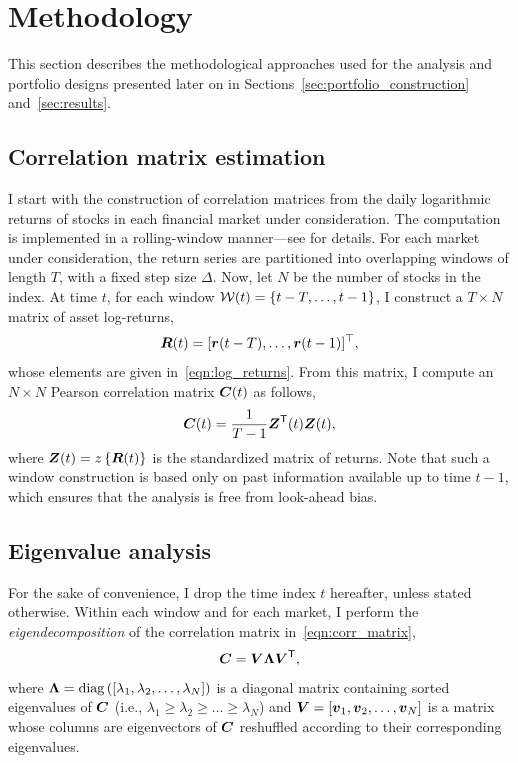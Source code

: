 \documentclass[pdflatex,sn-basic]{sn-jnl}%
\theoremstyle{thmstyleone}%
\theoremstyle{thmstyletwo}%
\theoremstyle{thmstylethree}%
\begin{document}
\section{Methodology}
\label{sec:method}

This section describes the methodological approaches used for the analysis and portfolio designs presented later on 
in Sections~\ref{sec:portfolio_construction} and~\ref{sec:results}. 

\subsection{Correlation matrix estimation}
\label{sec:rolling_window}
I start with the construction of correlation matrices from 
the daily logarithmic returns of stocks in each financial market under consideration. The computation is 
implemented in a rolling-window manner---see \citep{song2011evolution,adams2017correlations} for details.
For each market under consideration, the return series are partitioned into overlapping windows of length $T$, 
with a fixed step size $\Delta$. Now, let $N$ be the number of stocks in the index. At time $t$, 
for each window $\mathcal{W}(t)=\left\{ t-T, \ldots, t-1 \right\}$, I construct a $T\times N$ matrix of asset log-returns,
\begin{equation}
\label{eqn:return_matrix}
    \boldsymbol{R}(t) = [\boldsymbol{r}(t-T), \ldots, \boldsymbol{r}(t-1)]^{\top},
\end{equation}
whose elements are given in~\eqref{eqn:log_returns}. From this matrix, I compute an $N \times N$ Pearson correlation matrix $\boldsymbol{C}(t)$ as follows,
\begin{equation}
\label{eqn:corr_matrix}
    \boldsymbol{C}(t) = \frac{1}{T-1} \boldsymbol{Z}^{\textnormal{\textsf{T}}}(t)\boldsymbol{Z}(t),
\end{equation}
where $\boldsymbol{Z}(t) = z\left\{ \boldsymbol{R}(t) \right\}$ is the standardized matrix of returns. Note that such a window construction is based only on past information available up to time $t-1$, which ensures that the analysis is free from look-ahead bias.

\subsection{Eigenvalue analysis}
For the sake of convenience, I drop the time index $t$ hereafter, unless stated otherwise. Within each window and for each market, I perform the \textit{eigendecomposition} of the correlation matrix in~\eqref{eqn:corr_matrix}, 
\begin{equation}
\label{eqn:eigendecomposition}
    \boldsymbol{C} = \boldsymbol{V} \boldsymbol{\Lambda} \boldsymbol{V}^{\textnormal{\textsf{T}}},
\end{equation}
where $\boldsymbol{\Lambda} = \operatorname{diag}\left( [\lambda_1, \lambda_2, \ldots, \lambda_N] \right)$ is a diagonal matrix containing sorted eigenvalues of $\boldsymbol{C}$ (i.e., $\lambda_1 \geq \lambda_2 \geq \ldots \geq \lambda_N$) and $\boldsymbol{V} = [\boldsymbol{v}_1, \boldsymbol{v}_2, \ldots, \boldsymbol{v}_N]$ is a matrix whose columns are eigenvectors of $\boldsymbol{C}$ reshuffled according to their corresponding eigenvalues.
\end{document}
